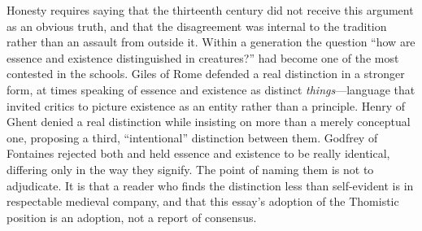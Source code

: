 Honesty requires saying that the thirteenth century did not receive this argument as an obvious truth, and that the disagreement was internal to the tradition rather than an assault from outside it. Within a generation the question ``how are essence and existence distinguished in creatures?'' had become one of the most contested in the schools. Giles of Rome defended a real distinction in a stronger form, at times speaking of essence and existence as distinct \emph{things}---language that invited critics to picture existence as an entity rather than a principle. Henry of Ghent denied a real distinction while insisting on more than a merely conceptual one, proposing a third, ``intentional'' distinction between them. Godfrey of Fontaines rejected both and held essence and existence to be really identical, differing only in the way they signify. The point of naming them is not to adjudicate. It is that a reader who finds the distinction less than self-evident is in respectable medieval company, and that this essay's adoption of the Thomistic position is an adoption, not a report of consensus.

